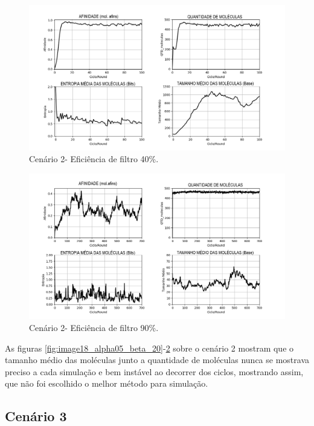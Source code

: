 \begin{figure}[!h]
    \centering
    \includegraphics[width=15cm]{figures/image19_alpha05_beta_40.png}
    \caption{Cenário 2- Eficiência de filtro 40\%.}
    \label{fig:image19_alpha05_beta_40}
\end{figure}

\begin{figure}[!h]
    \centering
    \includegraphics[width=15cm]{figures/image20_alpha05_beta_90.png}
    \caption{Cenário 2- Eficiência de filtro 90\%.}
    \label{fig:image20_alpha05_beta_90}
\end{figure}
\newpage

As figuras \ref{fig:image18_alpha05_beta_20}-\ref{fig:image20_alpha05_beta_90} sobre o cenário 2 mostram que o tamanho médio das moléculas
junto a quantidade de moléculas nunca se mostrava preciso a cada simulação e bem
instável ao decorrer dos ciclos, mostrando assim, que não foi escolhido o melhor método
para simulação.

\subsection{Cenário 3}


